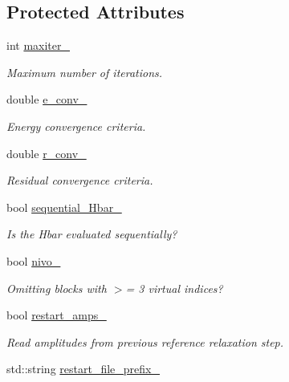 \subsection*{Protected Attributes}
\begin{DoxyCompactItemize}
\item 
int \mbox{\hyperlink{classforte_1_1_s_a___m_r_d_s_r_g_aafb45c7777206531d7579c0ad7e6b157}{maxiter\+\_\+}}
\begin{DoxyCompactList}\small\item\em Maximum number of iterations. \end{DoxyCompactList}\item 
double \mbox{\hyperlink{classforte_1_1_s_a___m_r_d_s_r_g_a9a6388e81e1a681a38789803c226b755}{e\+\_\+conv\+\_\+}}
\begin{DoxyCompactList}\small\item\em Energy convergence criteria. \end{DoxyCompactList}\item 
double \mbox{\hyperlink{classforte_1_1_s_a___m_r_d_s_r_g_a9039ca77c1c953726fe8bdf6261f9cda}{r\+\_\+conv\+\_\+}}
\begin{DoxyCompactList}\small\item\em Residual convergence criteria. \end{DoxyCompactList}\item 
bool \mbox{\hyperlink{classforte_1_1_s_a___m_r_d_s_r_g_a8848faa32f436e1e92c24a3195bc0041}{sequential\+\_\+\+Hbar\+\_\+}}
\begin{DoxyCompactList}\small\item\em Is the Hbar evaluated sequentially? \end{DoxyCompactList}\item 
bool \mbox{\hyperlink{classforte_1_1_s_a___m_r_d_s_r_g_abbbe3f0b9a3a076420cd802a68d5711a}{nivo\+\_\+}}
\begin{DoxyCompactList}\small\item\em Omitting blocks with $>$= 3 virtual indices? \end{DoxyCompactList}\item 
bool \mbox{\hyperlink{classforte_1_1_s_a___m_r_d_s_r_g_aea05c221c3008fa88980f0cb7149ee66}{restart\+\_\+amps\+\_\+}}
\begin{DoxyCompactList}\small\item\em Read amplitudes from previous reference relaxation step. \end{DoxyCompactList}\item 
std\+::string \mbox{\hyperlink{classforte_1_1_s_a___m_r_d_s_r_g_a9f95e3aec2f19b662801caa83f31c6b7}{restart\+\_\+file\+\_\+prefix\+\_\+}}

\end{DoxyCompactItemize}
